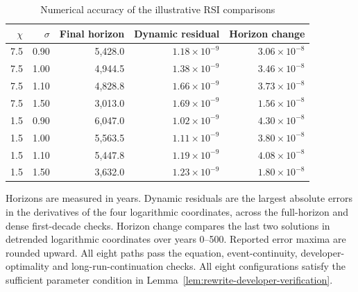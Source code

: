 \begin{table}[H]
\centering
\caption{Numerical accuracy of the illustrative RSI comparisons}
\label{tab:rewrite-rsi-illustrative-accuracy}
\small
\begin{tabular}{rrrrr}
\toprule
$\chi$ & $\sigma$ & Final horizon & Dynamic residual & Horizon change\\
\midrule
7.5 & 0.90 & 5,428.0 & $1.18\times10^{-9}$ & $3.06\times10^{-8}$\\
7.5 & 1.00 & 4,944.5 & $1.38\times10^{-9}$ & $3.46\times10^{-8}$\\
7.5 & 1.10 & 4,828.8 & $1.66\times10^{-9}$ & $3.73\times10^{-8}$\\
7.5 & 1.50 & 3,013.0 & $1.69\times10^{-9}$ & $1.56\times10^{-8}$\\
1.5 & 0.90 & 6,047.0 & $1.02\times10^{-9}$ & $4.30\times10^{-8}$\\
1.5 & 1.00 & 5,563.5 & $1.11\times10^{-9}$ & $3.80\times10^{-8}$\\
1.5 & 1.10 & 5,447.8 & $1.19\times10^{-9}$ & $4.08\times10^{-8}$\\
1.5 & 1.50 & 3,632.0 & $1.23\times10^{-9}$ & $1.80\times10^{-8}$\\
\bottomrule
\end{tabular}
\par\smallskip
\begin{minipage}{0.98\textwidth}\footnotesize
Horizons are measured in years. Dynamic residuals are the largest absolute
errors in the derivatives of the four logarithmic coordinates, across
the full-horizon and dense first-decade checks. Horizon change compares the
last two solutions in detrended logarithmic coordinates over years 0--500.
Reported error maxima are rounded upward. All eight paths pass the equation,
event-continuity, developer-optimality and long-run-continuation checks.
All eight configurations satisfy the sufficient parameter condition in
Lemma~\ref{lem:rewrite-developer-verification}.
\end{minipage}
\end{table}
